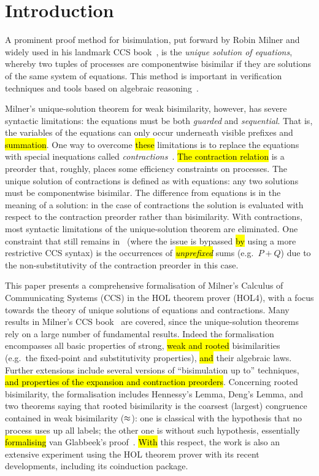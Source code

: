 \section{Introduction}

A prominent proof method for bisimulation, put forward by Robin Milner and widely used in his
landmark CCS book~\cite{Mil89}, is the
\emph{unique solution of equations}, whereby two tuples of processes are
componentwise bisimilar if they are solutions of the same system of equations.
This method is important in verification techniques and tools
based on algebraic reasoning~\cite{BaeBOOK,theoryAndPractice,RosUnder10}. 

Milner's unique-solution theorem for weak bisimilarity, however,
has severe syntactic limitations:
the equations must be both \emph{guarded} and \emph{sequential}. That is,
the variables of the equations can only occur underneath visible prefixes and \hl{summation}.
One way to overcome \hl{these} limitations is to replace the equations
with special inequations called
\emph{contractions}~\cite{sangiorgi2015equations,sangiorgi2017equations}. \hl{The
contraction relation} is a
preorder that, roughly, places some efficiency constraints on processes.
The unique solution of contractions is defined as with equations:
any two solutions must be componentwise bisimilar.
The difference from equations is in the meaning of a solution:
in the case of contractions the solution is evaluated with respect to
the contraction preorder rather than bisimilarity. 
With contractions, most syntactic limitations of the unique-solution theorem are
eliminated. One constraint that still remains
in~\cite{sangiorgi2017equations}
(where the issue is bypassed \hl{by} using a more
restrictive CCS syntax)
is the occurrences of \hl{\emph{unprefixed}} sums (e.g.~$P + Q$) due to
the non-substitutivity of the contraction preorder in this case.

This paper presents a comprehensive formalisation of Milner's Calculus of Communicating
Systems (CCS) in the HOL theorem prover (HOL4),
with a focus towards the theory of unique solutions of equations and contractions.
Many results in Milner's CCS book~\cite{Mil89} are covered, since
the unique-solution theorems rely on a large number of fundamental results.
Indeed the formalisation encompasses all basic properties of strong,
\hl{weak and rooted}
bisimilarities (e.g.~the fixed-point and substitutivity properties), \hl{and} their algebraic laws.
Further extensions include several versions of ``bisimulation up to''
techniques, \hl{and properties of the expansion and contraction preorders}.
Concerning rooted bisimilarity, the formalisation
includes Hennessy's Lemma, Deng's Lemma,
 and two theorems saying that rooted bisimilarity is the coarsest (largest)
 congruence contained in weak bisimilarity ($\approx$): one is classical
 with the hypothesis that no process uses up all labels;
the other one is 
without such hypothesis, essentially \hl{formalising} van Glabbeek's proof~\cite{van2005characterisation}.
\hl{With} this respect, the work is also an extensive experiment using the HOL theorem prover with its
recent developments, including its coinduction package.

